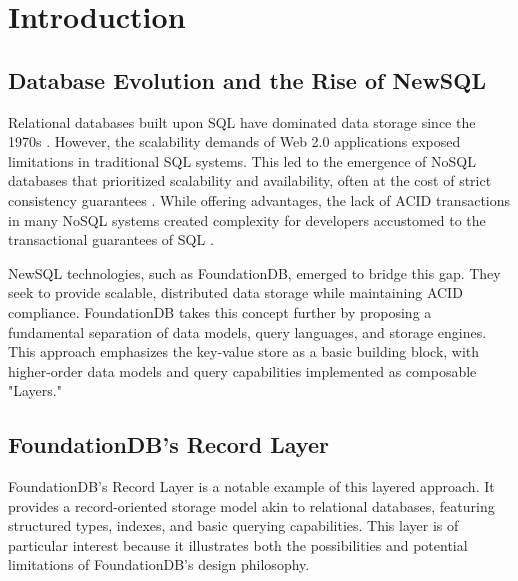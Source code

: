 \documentclass[sigconf]{acmart}
\begin{document}


\maketitle

\section{Introduction}
\subsection{Database Evolution and the Rise of NewSQL}
Relational databases built upon SQL have dominated data storage since the 1970s \cite{CoddTheory}. However, the scalability demands of Web 2.0 applications exposed limitations in traditional SQL systems. This led to the emergence of NoSQL databases that prioritized scalability and availability, often at the cost of strict consistency guarantees \cite{NewSQL}. While offering advantages, the lack of ACID transactions in many NoSQL systems created complexity for developers accustomed to the transactional guarantees of SQL \cite{NewSQL}.

NewSQL technologies, such as FoundationDB, emerged to bridge this gap. They seek to provide scalable, distributed data storage while maintaining ACID compliance. FoundationDB takes this concept further by proposing a fundamental separation of data models, query languages, and storage engines\cite{FoundationDBPaper}. This approach emphasizes the key-value store as a basic building block, with higher-order data models and query capabilities implemented as composable "Layers."

\subsection{FoundationDB's Record Layer}
FoundationDB's Record Layer\cite{FDBRecordLayer} is a notable example of this layered approach. It provides a record-oriented storage model akin to relational databases, featuring structured types, indexes, and basic querying capabilities. This layer is of particular interest because it illustrates both the possibilities and potential limitations of FoundationDB's design philosophy.
\end{document}
